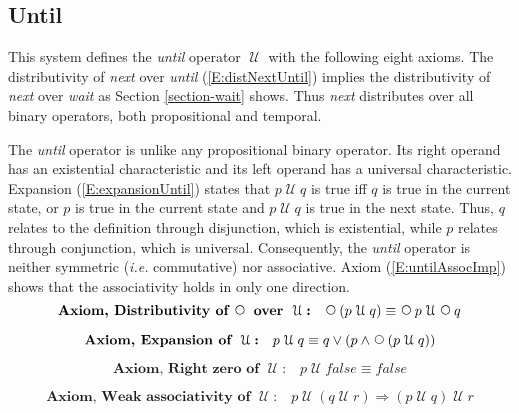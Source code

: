 \documentclass[12pt, fleqn, leqno]{article}
\newcommand{\impl}{\ensuremath{\Rightarrow}}        %
\newcommand{\Until}{\;\mathcal{U}\;}
\newcommand{\Next}{\;\,\text{\raisebox{3.5pt}{\circle{6}}}}
\newcommand{\firstspacer}{\vspace{-26pt}}
\begin{document}

\subsection{Until}\label{section-until}

This system defines the \textit{until} operator $\Until$ with the following eight axioms.
The distributivity of \textit{next} over \textit{until} (\ref{E:distNextUntil}) implies the distributivity of \textit{next} over \textit{wait} as Section \ref{section-wait} shows.
Thus \textit{next} distributes over all binary operators, both propositional and temporal.

The \textit{until} operator is unlike any propositional binary operator.
Its right operand has an existential characteristic and its left operand has a universal characteristic.
Expansion (\ref{E:expansionUntil}) states that
$p\Until q$ is true iff $q$ is true in the current state, or $p$ is true in the current state and $p\Until q$ is
true in the next state.
Thus, $q$ relates to the definition through disjunction, which is existential,
while $p$ relates through conjunction, which is universal.
Consequently, the \textit{until} operator is neither symmetric (\textit{i.e.} commutative) nor associative.
Axiom (\ref{E:untilAssocImp}) shows that the associativity holds in only one direction.
\begin{equation}\label{E:distNextUntil}
\textbf{Axiom, Distributivity of $\Next$ over $\Until$:}\quad \Next (p \Until q) \equiv \Next p \Until \Next q
\end{equation}

\firstspacer

\begin{equation}\label{E:expansionUntil}
\textbf{Axiom, Expansion of $\Until$:}\quad p \Until q \equiv q \lor (p \land \Next (p \Until q))
\end{equation}

\firstspacer

\begin{equation}\label{E:untilFalse}
\textbf{Axiom, Right zero of $\Until$:}\quad p \Until false \equiv false
\end{equation}

\firstspacer

\begin{equation}\label{E:untilAssocImp}
\textbf{Axiom, Weak associativity of $\Until$:}\quad p \Until (q \Until r) \impl (p \Until q) \Until r
\end{equation}
\end{document}
